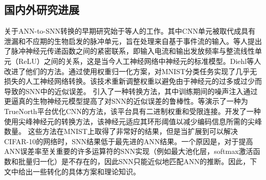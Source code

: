 \subsection{国内外研究进展}
\par
关于ANN-to-SNN转换的早期研究始于等人的工作。其中CNN单元被取代成具有泄漏和不应期的生物启发的脉冲单元，旨在处理来自基于事件流的输入。等人提出了脉冲神经元传递函数之间的紧密联系，即输入电流和输出发放频率与整流线性单元（ReLU）之间的关系，这是当今人工神经网络中神经元的标准模型。Diehl等人改进了他们的方法。通过使用权重归一化方案，对MNIST分类任务实现了几乎无损失的人工神经网络转换。该技术重新调整权重以避免由于神经元的过多或过少而导致的SNN中的近似误差。
引入了一种转换方法，其中训练期间的噪声注入通过更逼真的生物神经元模型提高了对SNN的近似误差的鲁棒性。等演示了一种为TrueNorth平台优化CNN的方法，该平台具有二进制权重和受限连接。开发了一种使用尖峰神经元的转换方法，该神经元适应其环形阈值以减少编码信息所需的尖峰数量。
这些方法在MNIST上取得了非常好的结果，但是当扩展到可以解决CIFAR-10的网络时，SNN结果低于最先进的ANN结果。一个原因是，对于提高ANN误差率至关重要的许多运算符的SNN实现（例如最大池化层，softmax激活函数和批量归一化）是不存在的，因此SNN只能近似地匹配ANN的推断。因此，下文中给出一些转化的具体方案和理论知识。
